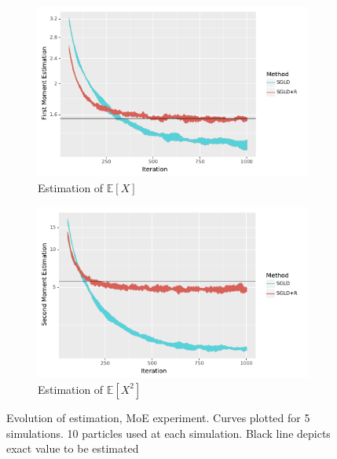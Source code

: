 \begin{figure}[!htb]
    \centering
    \begin{subfigure}[b]{0.45\textwidth}
        \includegraphics[width=\textwidth]{img/exp1_MOO}
        \caption{Estimation of $\mathbb{E}\left[X\right]$}
        \label{fig:gull}
    \end{subfigure}
    \begin{subfigure}[b]{0.45\textwidth}
        \includegraphics[width=\textwidth]{img/exp2_MOO}
        \caption{Estimation of $\mathbb{E}\left[X^2\right]$}
        \label{fig:tiger}
    \end{subfigure}
    \caption{Evolution of estimation, MoE experiment. Curves plotted for 5 simulations. 10 particles used at each simulation. Black line depicts exact value to be estimated}\label{fig:moe}
\end{figure}

